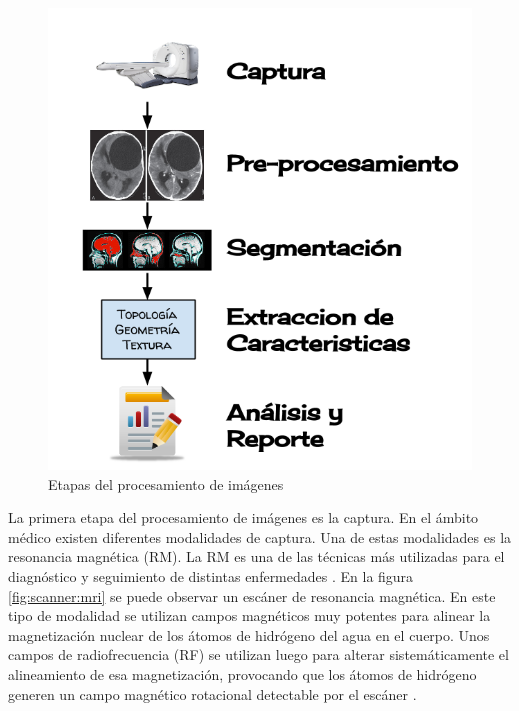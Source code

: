 \begin{figure}[h!]
\centering
\includegraphics[scale=0.3]{images/procesamiento.png}
\caption{Etapas del procesamiento de imágenes}
\label{fig:etapas_del_procesamiento}
\end{figure}

La primera etapa del procesamiento de imágenes es la captura. En el ámbito médico existen diferentes modalidades de captura. Una de estas modalidades es la resonancia magnética (RM). La RM es una de las técnicas más utilizadas para el diagnóstico y seguimiento de distintas enfermedades \citep{prince2006medical}. En la figura \ref{fig:scanner:mri} se puede observar un escáner de resonancia magnética.  En este tipo de modalidad se utilizan campos magnéticos muy potentes para alinear la magnetización nuclear de los átomos  de hidrógeno del agua en el cuerpo. Unos campos de radiofrecuencia (RF) se utilizan luego para alterar sistemáticamente el alineamiento de esa magnetización, provocando que los átomos de hidrógeno generen un campo magnético rotacional detectable por el escáner \citep{novelline2004squire}.

